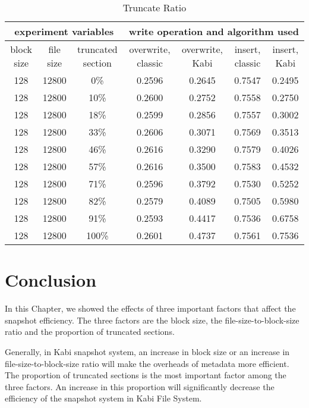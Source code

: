 \begin{lscape} 
\begin{table}
\caption{Truncate Ratio}
\label{tab:truncate_ratio}
\begin{center}
\begin{tabular}{|c|c|c|c|c|c|c|}
\hline
\multicolumn{3}{|c|}{experiment variables} & \multicolumn{4}{c|}{write operation and algorithm used} \\
\hline
block size & file size & truncated section & overwrite, classic & overwrite, Kabi & insert, classic & insert, Kabi\\
\hline
128 & 12800 & 0\% & 0.2596 & 0.2645 & 0.7547 & 0.2495 \\
\hline
128 & 12800 & 10\% & 0.2600 & 0.2752 & 0.7558 & 0.2750 \\
\hline
128 & 12800 & 18\% & 0.2599 & 0.2856 & 0.7557 & 0.3002 \\
\hline
128 & 12800 & 33\% & 0.2606 & 0.3071 & 0.7569 & 0.3513 \\
\hline
128 & 12800 & 46\% & 0.2616 & 0.3290 & 0.7579 & 0.4026 \\
\hline
128 & 12800 & 57\% & 0.2616 & 0.3500 & 0.7583 & 0.4532 \\
\hline
128 & 12800 & 71\% & 0.2596 & 0.3792 & 0.7530 & 0.5252 \\
\hline
128 & 12800 & 82\% & 0.2579 & 0.4089 & 0.7505 & 0.5980 \\
\hline
128 & 12800 & 91\% & 0.2593 & 0.4417 & 0.7536 & 0.6758 \\
\hline
128 & 12800 & 100\% & 0.2601 & 0.4737 & 0.7561 & 0.7536 \\
\hline
\end{tabular}
\end{center}
\end{table}
\end{lscape}

\section{Conclusion}

    In this Chapter, we showed the effects of three important factors that affect the snapshot efficiency. The three factors are the block size, the file-size-to-block-size ratio and the proportion of truncated sections.

    Generally, in Kabi snapshot system, an increase in block size or an increase in file-size-to-block-size ratio will make the overheads of metadata more efficient. The proportion of truncated sections is the most important factor among the three factors. An increase in this proportion will significantly decrease the efficiency of the snapshot system in Kabi File System.

